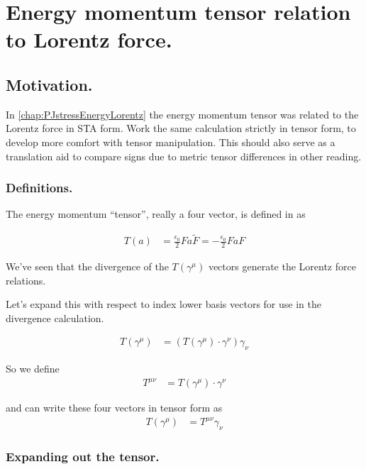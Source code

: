 \chapter{Energy momentum tensor relation to Lorentz force. }
\date{ Feb 17, 2009.  Last Revision: $Date: 2009/06/04 13:13:27 $ }

\section{Motivation. }

In \ref{chap:PJstressEnergyLorentz} the energy momentum tensor was related
to the Lorentz force in STA form.  Work the same calculation strictly in
tensor form, to
develop more comfort with tensor manipulation.  This should also serve
as a translation aid to compare signs due to metric tensor differences 
in other reading.

\subsection{Definitions. }

The energy momentum ``tensor'', really a four vector, is defined
in \cite{doran2003gap}
as

\begin{align}
T(a) &= 
\frac{\epsilon_0}{2} F a \tilde{F} = -\frac{\epsilon_0}{2} F a {F} 
\end{align}

We've seen that the divergence of the $T(\gamma^\mu)$ vectors generate
the Lorentz force relations.

Let's expand this with respect to index lower basis vectors for use in the
divergence calculation.

\begin{align}
T(\gamma^\mu) &= (T(\gamma^\mu) \cdot \gamma^\nu) \gamma_\nu 
\end{align}

So we define
\begin{align}
T^{\mu \nu} 
&= T(\gamma^\mu) \cdot \gamma^\nu
\end{align}

and can write these four vectors in tensor form as
\begin{align}
T(\gamma^\mu) &= T^{\mu \nu} \gamma_\nu 
\end{align}

\subsection{Expanding out the tensor. }


